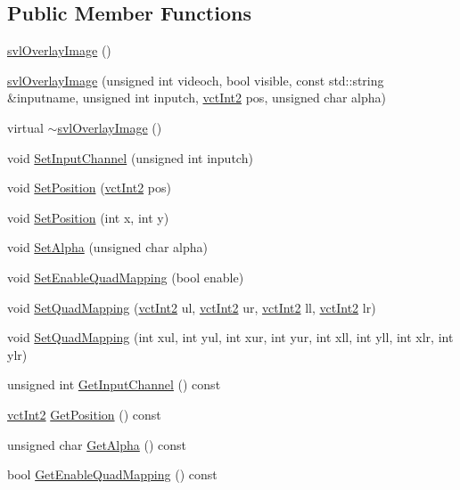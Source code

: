 \subsection*{Public Member Functions}
\begin{DoxyCompactItemize}
\item 
\hyperlink{classsvl_overlay_image_aadceba5bd71c27bb6a632789673e003e}{svl\+Overlay\+Image} ()
\item 
\hyperlink{classsvl_overlay_image_a6956a988cbeae9213ae0520086a23559}{svl\+Overlay\+Image} (unsigned int videoch, bool visible, const std\+::string \&inputname, unsigned int inputch, \hyperlink{vct_fixed_size_vector_types_8h_add8c88eb6a432b15f14b866b9c35325f}{vct\+Int2} pos, unsigned char alpha)
\item 
virtual \hyperlink{classsvl_overlay_image_aa1e16ea8f0f2c80efdd3341b2a338416}{$\sim$svl\+Overlay\+Image} ()
\item 
void \hyperlink{classsvl_overlay_image_a06c65bd1c863ed671e49006e423651ef}{Set\+Input\+Channel} (unsigned int inputch)
\item 
void \hyperlink{classsvl_overlay_image_af9eec05637c4c9ce2682927c9621596b}{Set\+Position} (\hyperlink{vct_fixed_size_vector_types_8h_add8c88eb6a432b15f14b866b9c35325f}{vct\+Int2} pos)
\item 
void \hyperlink{classsvl_overlay_image_ab5139e999681e0700ca3d2125116fe33}{Set\+Position} (int x, int y)
\item 
void \hyperlink{classsvl_overlay_image_a32c2a6442350329c2da5bd6fca8508fa}{Set\+Alpha} (unsigned char alpha)
\item 
void \hyperlink{classsvl_overlay_image_acc8324b4242f126bb79984f4c44debbd}{Set\+Enable\+Quad\+Mapping} (bool enable)
\item 
void \hyperlink{classsvl_overlay_image_a0b2eea4c2d5efff893d56e0c6101b251}{Set\+Quad\+Mapping} (\hyperlink{vct_fixed_size_vector_types_8h_add8c88eb6a432b15f14b866b9c35325f}{vct\+Int2} ul, \hyperlink{vct_fixed_size_vector_types_8h_add8c88eb6a432b15f14b866b9c35325f}{vct\+Int2} ur, \hyperlink{vct_fixed_size_vector_types_8h_add8c88eb6a432b15f14b866b9c35325f}{vct\+Int2} ll, \hyperlink{vct_fixed_size_vector_types_8h_add8c88eb6a432b15f14b866b9c35325f}{vct\+Int2} lr)
\item 
void \hyperlink{classsvl_overlay_image_a94280006554b1e3a5c0cb7190306bb1d}{Set\+Quad\+Mapping} (int xul, int yul, int xur, int yur, int xll, int yll, int xlr, int ylr)
\item 
unsigned int \hyperlink{classsvl_overlay_image_af84067f5472b9543c716fefda47aa954}{Get\+Input\+Channel} () const 
\item 
\hyperlink{vct_fixed_size_vector_types_8h_add8c88eb6a432b15f14b866b9c35325f}{vct\+Int2} \hyperlink{classsvl_overlay_image_a73fe36ec044c12e09a4556db4ccf8953}{Get\+Position} () const 
\item 
unsigned char \hyperlink{classsvl_overlay_image_a9c76c4ef1071e27a5653136091d51a2e}{Get\+Alpha} () const 
\item 
bool \hyperlink{classsvl_overlay_image_aaf3a1c081f90608c0927c5433fe6df24}{Get\+Enable\+Quad\+Mapping} () const 
\end{DoxyCompactItemize}
